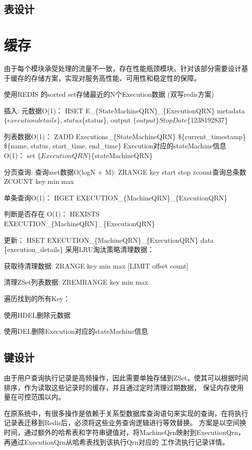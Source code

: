 \subsection{表设计}

\section{缓存}
由于每个模块承受处理的流量不一致，存在性能瓶颈模块。针对该部分需要设计基于缓存的存储方案，实现对服务高性能、可用性和稳定性的保障。



使用REDIS 的sorted set存储最近的N个Execution数据 (双写redis方案)

插入:
元数据O(1)：
HSET E\_\{StateMachineQRN\}\_\{ExecutionQRN\} metadata $\{execution details\}, status $\{status\}, output $\{output\} StopDate $\{1238192837\}

列表数据O(1)：
ZADD Executions\_\{StateMachineQRN\} \$\{current\_timestamp\} \$\{name, status, start\_time, end\_time\}
Execution对应的stateMachine信息 O(1)：
set $\{ExecutionQRN\} $\{stateMachineQRN\}

分页查询:
查询zset数据O(logN + M): ZRANGE key start stop
zcount查询总条数 ZCOUNT key min max

单条查询O(1)：
HGET  EXECUTION\_\{MachineQRN\}\_\{ExecutionQRN\}

判断是否存在 O(1)：
HEXISTS EXECUTION\_\{MachineQRN\}\_\{ExecutionQRN\}

更新：
HSET EXECUTION\_\{MachineQRN\}\_\{ExecutionQRN\} data \{execution\_details\}
采用LRU淘汰策略清理数据：

获取待清理数据: ZRANGE key min max [LIMIT offset count]

清理ZSet列表数据: ZREMRANGE key min max

遍历找到的所有Key：

使用HDEL删除元数据

使用DEL删除Execution对应的stateMachine信息



\subsection{键设计}
由于用户查询执行记录是高频操作，因此需要单独存储到ZSet，使其可以根据时间排序，作为读取这些记录时的缓存，并且通过定时清理过期数据，
保证内存使用量在可控范围以内。

在原系统中，有很多操作是依赖于关系型数据库查询语句来实现的查询，在将执行记录表迁移到Redis后，必须将这些业务查询逻辑进行等效替换。
方案是以空间换时间，通过额外的哈希表和字符串键值对，将MachineQrn映射到ExecutionQrn，再通过ExecutionQrn从哈希表找到该执行Qrn对应的
工作流执行记录详情。

